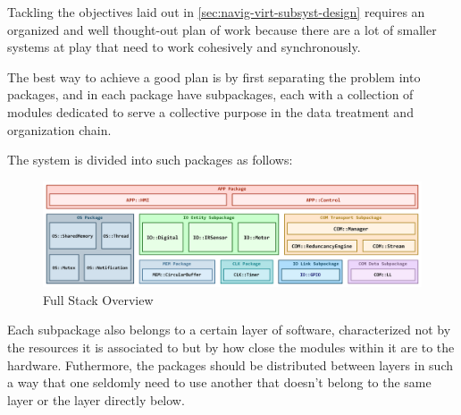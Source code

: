 Tackling the objectives laid out in \cref{sec:navig-virt-subsyst-design} requires an organized and well thought-out plan of work because there are a lot of smaller systems at play that need to work cohesively and synchronously. 





The best way to achieve a good plan is by first separating the problem into packages, and in each package have subpackages, each with a collection of modules dedicated to serve a collective purpose in the data treatment and organization chain. 

The system is divided into such packages as follows:

\begin{figure}[H]
	\centering
	\includegraphics[width=1.0\textwidth]{./img/full-stack-overview.png}
	\caption {Full Stack Overview}
	\label{fig:full-stack-overview}
	\end{figure}
	



Each subpackage also belongs to a certain layer of software, characterized not by the resources it is associated to but by how close the modules within it are to the hardware. Futhermore, the packages should be distributed between layers in such a way that one seldomly need to use another that doesn't belong to the same layer or the layer directly below. 


